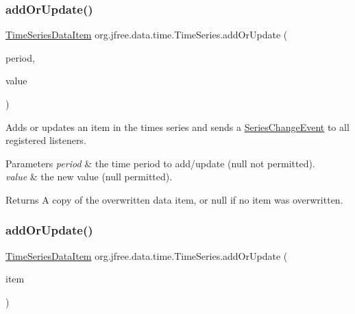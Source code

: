 \subsubsection{\texorpdfstring{add\+Or\+Update()}{addOrUpdate()}\hspace{0.1cm}{\footnotesize\ttfamily [2/3]}}
{\footnotesize\ttfamily \mbox{\hyperlink{classorg_1_1jfree_1_1data_1_1time_1_1_time_series_data_item}{Time\+Series\+Data\+Item}} org.\+jfree.\+data.\+time.\+Time\+Series.\+add\+Or\+Update (\begin{DoxyParamCaption}\item[{\mbox{\hyperlink{classorg_1_1jfree_1_1data_1_1time_1_1_regular_time_period}{Regular\+Time\+Period}}}]{period,  }\item[{Number}]{value }\end{DoxyParamCaption})}

Adds or updates an item in the times series and sends a \mbox{\hyperlink{}{Series\+Change\+Event}} to all registered listeners.


\begin{DoxyParams}{Parameters}
{\em period} & the time period to add/update ({\ttfamily null} not permitted). \\
\hline
{\em value} & the new value ({\ttfamily null} permitted).\\
\hline
\end{DoxyParams}
\begin{DoxyReturn}{Returns}
A copy of the overwritten data item, or {\ttfamily null} if no item was overwritten. 
\end{DoxyReturn}
\mbox{\label{classorg_1_1jfree_1_1data_1_1time_1_1_time_series_ad544734221ab25ca1b6e18deb90306fa}} 
\subsubsection{\texorpdfstring{add\+Or\+Update()}{addOrUpdate()}\hspace{0.1cm}{\footnotesize\ttfamily [3/3]}}
{\footnotesize\ttfamily \mbox{\hyperlink{classorg_1_1jfree_1_1data_1_1time_1_1_time_series_data_item}{Time\+Series\+Data\+Item}} org.\+jfree.\+data.\+time.\+Time\+Series.\+add\+Or\+Update (\begin{DoxyParamCaption}\item[{\mbox{\hyperlink{classorg_1_1jfree_1_1data_1_1time_1_1_time_series_data_item}{Time\+Series\+Data\+Item}}}]{item }\end{DoxyParamCaption})}

